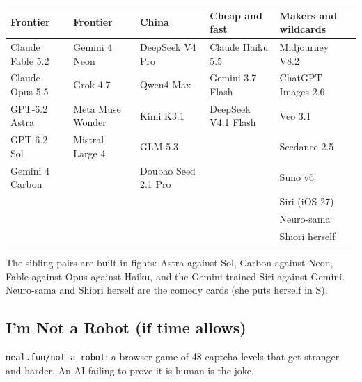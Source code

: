 \documentclass[11pt,a4paper]{article}
\begin{document}
\begin{center}\small
\begin{tabular}{@{}lllll@{}}
\toprule
\textbf{Frontier} & \textbf{Frontier} & \textbf{China} & \textbf{Cheap and fast} & \textbf{Makers and wildcards} \\
\midrule
Claude Fable 5.2 & Gemini 4 Neon & DeepSeek V4 Pro & Claude Haiku 5.5 & Midjourney V8.2 \\
Claude Opus 5.5 & Grok 4.7 & Qwen4-Max & Gemini 3.7 Flash & ChatGPT Images 2.6 \\
GPT-6.2 Astra & Meta Muse Wonder & Kimi K3.1 & DeepSeek V4.1 Flash & Veo 3.1 \\
GPT-6.2 Sol & Mistral Large 4 & GLM-5.3 & & Seedance 2.5 \\
Gemini 4 Carbon & & Doubao Seed 2.1 Pro & & Suno v6 \\
 & & & & Siri (iOS 27) \\
 & & & & Neuro-sama \\
 & & & & Shiori herself \\
\bottomrule
\end{tabular}
\end{center}
The sibling pairs are built-in fights: Astra against Sol, Carbon against Neon, Fable against Opus against Haiku, and the Gemini-trained Siri against Gemini. Neuro-sama and Shiori herself are the comedy cards (she puts herself in S).

\subsection{I'm Not a Robot (if time allows)}
\texttt{neal.fun/not-a-robot}: a browser game of 48 captcha levels that get stranger and harder. An AI failing to prove it is human is the joke.
\end{document}
